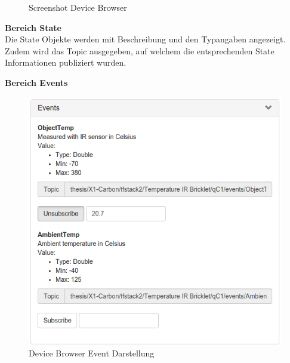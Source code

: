 {\begin{figure}[H]
	\centering
	\caption{Screenshot Device Browser}
\end{figure}


\newpage

\textbf{Bereich State} \\
Die State Objekte werden mit Beschreibung und den Typangaben angezeigt. Zudem wird das Topic ausgegeben, auf welchem die entsprechenden State Informationen publiziert wurden.


\textbf{Bereich Events}

\begin{figure}[H]
	\centering
        \includegraphics[width=0.7\linewidth]{bilder/device_browser_events.png} 
    \caption{Device Browser Event Darstellung}
\end{figure}

}
